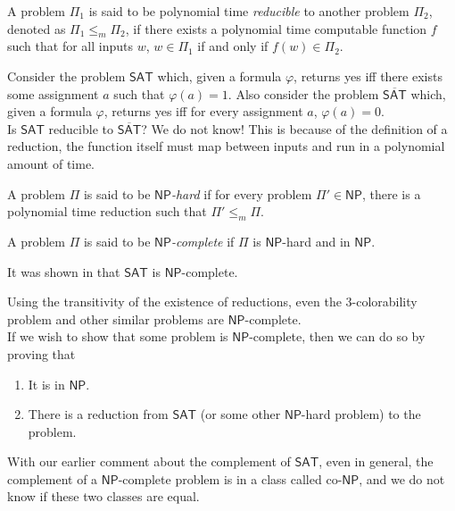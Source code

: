 	\begin{definition}[Reduction]
		A problem $\mathsf{\Pi}_1$ is said to be polynomial time \textit{reducible} to another problem $\mathsf{\Pi}_2$, denoted as $\mathsf{\Pi}_1 \leq_m \mathsf{\Pi}_2$, if there exists a polynomial time computable function $f$ such that for all inputs $w$, $w\in\mathsf{\Pi}_1$ if and only if $f(w)\in\mathsf{\Pi}_2$.
	\end{definition}

	Consider the problem $\mathsf{SAT}$ which, given a formula $\varphi$, returns yes iff there exists some assignment $a$ such that $\varphi(a) = 1$. Also consider the problem $\overline{\mathsf{SAT}}$ which, given a formula $\varphi$, returns yes iff for every assignment $a$, $\varphi(a) = 0$. \\
	Is $\mathsf{SAT}$ reducible to $\overline{\mathsf{SAT}}$? We do not know! This is because of the definition of a reduction, the function itself must map between inputs and run in a polynomial amount of time.

	\begin{definition}
		A problem $\mathsf{\Pi}$ is said to be \textit{$\mathsf{NP}$-hard} if for every problem $\mathsf{\Pi}' \in \mathsf{NP}$, there is a polynomial time reduction such that $\mathsf{\Pi}' \leq_m \mathsf{\Pi}$.
	\end{definition}

	\begin{definition}
		A problem $\mathsf{\Pi}$ is said to be \textit{$\mathsf{NP}$-complete} if $\mathsf{\Pi}$ is $\mathsf{NP}$-hard and in $\mathsf{NP}$.
	\end{definition}

	It was shown in \cite{cookSAT,levinSAT} that $\mathsf{SAT}$ is $\mathsf{NP}$-complete.

	Using the transitivity of the existence of reductions, even the $3$-colorability problem and other similar problems are $\mathsf{NP}$-complete.\\
	If we wish to show that some problem is $\mathsf{NP}$-complete, then we can do so by proving that
	\begin{enumerate}
		\item It is in $\mathsf{NP}$.
		\item There is a reduction from $\mathsf{SAT}$ (or some other $\mathsf{NP}$-hard problem) to the problem.
	\end{enumerate}

	With our earlier comment about the complement of $\mathsf{SAT}$, even in general, the complement of a $\mathsf{NP}$-complete problem is in a class called co-$\mathsf{NP}$, and we do not know if these two classes are equal.

